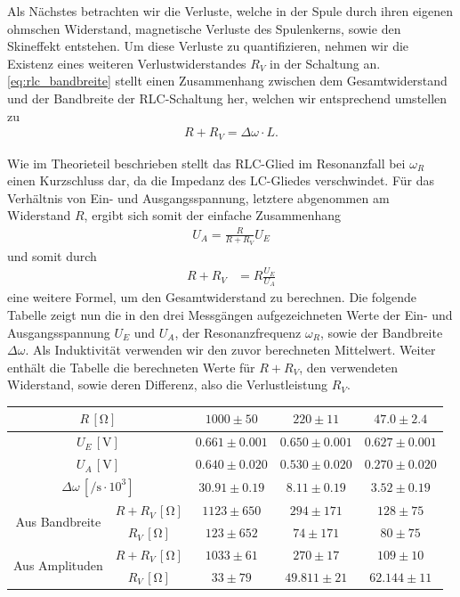 Als Nächstes betrachten wir die Verluste, welche in der Spule durch ihren eigenen ohmschen Widerstand, magnetische Verluste des Spulenkerns, sowie den Skineffekt entstehen. Um diese Verluste zu quantifizieren, nehmen wir die Existenz eines weiteren Verlustwiderstandes $R_V$ in der Schaltung an. \eqref{eq:rlc_bandbreite} stellt einen Zusammenhang zwischen dem Gesamtwiderstand und der Bandbreite der RLC-Schaltung her, welchen wir entsprechend umstellen zu
\begin{align}
  R + R_V = \Delta \omega \cdot L.
\end{align}

Wie im Theorieteil beschrieben stellt das RLC-Glied im Resonanzfall bei $\omega_R$ einen Kurzschluss dar, da die Impedanz des LC-Gliedes verschwindet. Für das Verhältnis von Ein- und Ausgangsspannung, letztere abgenommen am Widerstand $R$, ergibt sich somit der einfache Zusammenhang
\begin{align}
  U_A = \frac{R}{R + R_V} U_E
\end{align}
und somit durch
\begin{align}
  R + R_V &= R \frac{U_E}{U_A}
\end{align}
eine weitere Formel, um den Gesamtwiderstand zu berechnen. Die folgende Tabelle zeigt nun die in den drei Messgängen aufgezeichneten Werte der Ein- und Ausgangsspannung $U_E$ und $U_A$, der Resonanzfrequenz $\omega_R$, sowie der Bandbreite $\Delta \omega$. Als Induktivität verwenden wir den zuvor berechneten Mittelwert. Weiter enthält die Tabelle die berechneten Werte für $R + R_V$, den verwendeten Widerstand, sowie deren Differenz, also die Verlustleistung $R_V$.

\begin{table}[H]
  \centering
  \begin{tabular}{|c|c|c|c|c|}
    \hline
    \multicolumn{2}{|c|}{$R\,[\si{\ohm}]$} & $1000 \pm 50$ & $220 \pm 11$ & $47.0 \pm 2.4$ \\
    \hline
    \multicolumn{2}{|c|}{$U_E\,[\si{\volt}]$} & $0.661 \pm 0.001$ & $0.650 \pm 0.001$ & $0.627 \pm 0.001$ \\
    \hline
    \multicolumn{2}{|c|}{$U_A\,[\si{\volt}]$} & $0.640 \pm 0.020$ & $0.530 \pm 0.020$ & $0.270 \pm 0.020$ \\
    \hline
    \multicolumn{2}{|c|}{$\Delta \omega\,[\si{\per\second} \cdot 10^3]$} & $30.91 \pm 0.19$ & $8.11 \pm 0.19$ & $3.52 \pm 0.19$ \\
    \hline
    \hline
    \multirow{2}{*}{Aus Bandbreite} & $R + R_V\,[\si{\ohm}]$ & $1123 \pm 650$ & $294 \pm 171$ & $128 \pm 75$ \\
    \cline{2-5}
    & $R_V\,[\si{\ohm}]$ & $123 \pm 652$ & $74 \pm 171$ & $80 \pm 75$ \\
    \hline
    \hline
    \multirow{2}{*}{Aus Amplituden} & $R + R_V\,[\si{\ohm}]$  & $1033 \pm 61$ & $270 \pm 17$ & $109 \pm 10$ \\
    \cline{2-5}
    & $R_V\,[\si{\ohm}]$ & $33 \pm 79$ & $49.811 \pm 21$ & $62.144 \pm 11$ \\
    \hline
  \end{tabular}
\end{table}